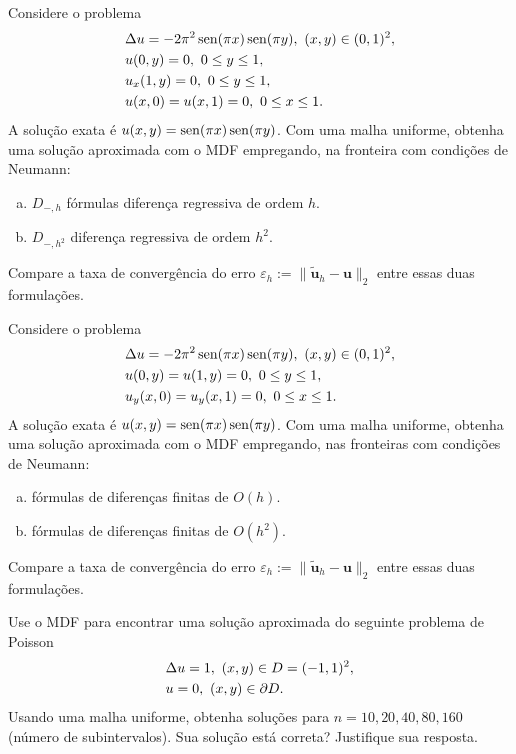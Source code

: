 \begin{exer}
  Considere o problema
  \begin{subequations}
    \begin{align}
      &\Delta u = -2\pi^2\operatorname{sen}(\pi x)\operatorname{sen}(\pi y),~(x, y)\in (0, 1)^2,\\
      &u(0,y) = 0, ~0\leq y\leq 1,\\
      &u_x(1,y) = 0, ~0\leq y\leq 1,\\
      &u(x,0) = u(x,1) = 0, ~0\leq x\leq 1.
    \end{align}
\end{subequations}
A solução exata é $u(x,y) = \operatorname{sen}(\pi x)\operatorname{sen}(\pi y)$. Com uma malha uniforme, obtenha uma solução aproximada com o MDF empregando, na fronteira com condições de Neumann{\neumann}:
\begin{enumerate}[a)]
\item $D_{-,h}$ fórmulas diferença regressiva de ordem $h$.
\item $D_{-,h^2}$ diferença regressiva de ordem $h^2$.
\end{enumerate}
Compare a taxa de convergência do erro $\varepsilon_h := \|\tilde{\pmb{u}}_h -\pmb{u}\|_2$ entre essas duas formulações.
\end{exer}

\begin{exer}
  Considere o problema
  \begin{subequations}
    \begin{align}
      &\Delta u = -2\pi^2\operatorname{sen}(\pi x)\operatorname{sen}(\pi y),~(x, y)\in (0, 1)^2,\\
      &u(0,y) = u(1,y) = 0, ~0\leq y\leq 1,\\
      &u_y(x,0) = u_y(x,1) = 0, ~0\leq x\leq 1.
    \end{align}
\end{subequations}
A solução exata é $u(x,y) = \operatorname{sen}(\pi x)\operatorname{sen}(\pi y)$. Com uma malha uniforme, obtenha uma solução aproximada com o MDF empregando, nas fronteiras com condições de Neumann:
\begin{enumerate}[a)]
\item fórmulas de diferenças finitas de $O(h)$.
\item fórmulas de diferenças finitas de $O(h^2)$.
\end{enumerate}
Compare a taxa de convergência do erro $\varepsilon_h := \|\tilde{\pmb{u}}_h -\pmb{u}\|_2$ entre essas duas formulações.
\end{exer}

\begin{exer}
  Use o MDF para encontrar uma solução aproximada do seguinte problema de Poisson
  \begin{subequations}
    \begin{align}
      &\Delta u = 1,~(x, y)\in D=(-1, 1)^2,\\
      &u = 0, ~(x,y)\in\partial D.
    \end{align}
\end{subequations}
Usando uma malha uniforme, obtenha soluções para $n = 10, 20, 40, 80, 160$ (número de subintervalos). Sua solução está correta? Justifique sua resposta.
\end{exer}

